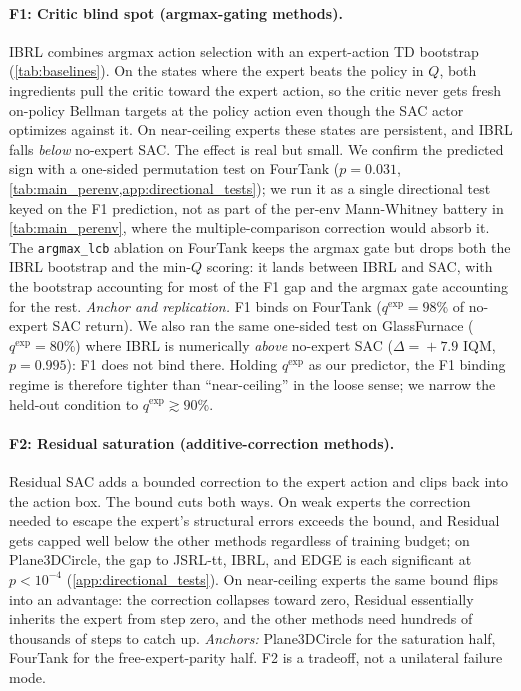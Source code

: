 \documentclass{article}
\begin{document}
\paragraph{F1: Critic blind spot (argmax-gating methods).}
IBRL combines argmax action selection with an expert-action TD
bootstrap (\cref{tab:baselines}). On the states where the expert
beats the policy in $Q$, both ingredients pull the critic toward
the expert action, so the critic never gets fresh on-policy
Bellman targets at the policy action even though the SAC actor
optimizes against it. On near-ceiling experts these states are
persistent, and IBRL falls \emph{below} no-expert SAC. The effect
is real but small. We confirm the predicted sign with a one-sided
permutation test on FourTank ($p{=}0.031$,
\cref{tab:main_perenv,app:directional_tests}); we run it as a single
directional test
keyed on the F1 prediction, not as part of the per-env
Mann-Whitney battery in \cref{tab:main_perenv}, where the
multiple-comparison correction would absorb it. The
\texttt{argmax\_lcb} ablation on FourTank keeps the argmax gate
but drops both the IBRL bootstrap and the min-$Q$ scoring: it
lands between IBRL and SAC, with the bootstrap accounting for
most of the F1 gap and the argmax gate accounting for the rest.
\emph{Anchor and replication.} F1 binds on FourTank
($q^{\mathrm{exp}}\!=\!98\%$ of no-expert SAC return). We also
ran the same one-sided test on GlassFurnace
($q^{\mathrm{exp}}\!=\!80\%$) where IBRL is numerically
\emph{above} no-expert SAC ($\Delta\!=\!+7.9$ IQM, $p{=}0.995$):
F1 does not bind there. Holding $q^{\mathrm{exp}}$ as our
predictor, the F1 binding regime is therefore tighter than
``near-ceiling'' in the loose sense; we narrow the held-out
condition to $q^{\mathrm{exp}}\!\gtrsim\!90\%$.

\paragraph{F2: Residual saturation (additive-correction methods).}
Residual SAC adds a bounded correction to the expert action and
clips back into the action box. The bound cuts both ways. On weak
experts the correction needed to escape the expert's structural
errors exceeds the bound, and Residual gets capped well below the
other methods regardless of training budget; on Plane3DCircle, the
gap to JSRL-tt, IBRL, and EDGE is each significant at
$p{<}10^{-4}$ (\cref{app:directional_tests}). On near-ceiling
experts the same bound flips into an advantage: the correction
collapses toward zero, Residual essentially inherits the expert
from step zero, and the other methods need hundreds of thousands
of steps to catch up. \emph{Anchors:} Plane3DCircle for the
saturation half, FourTank for the free-expert-parity half. F2 is a
tradeoff, not a unilateral failure mode.
\end{document}
